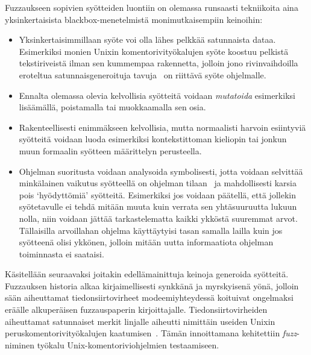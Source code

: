 Fuzzaukseen sopivien syötteiden luontiin on olemassa runsaasti tekniikoita
aina yksinkertaisista blackbox-menetelmistä monimutkaisempiin keinoihin:
\begin{itemize}
    \item Yksinkertaisimmillaan syöte voi olla lähes pelkkää satunnaista dataa.
          Esimerkiksi monien Unixin komentorivityökalujen syöte koostuu pelkistä tekstiriveistä
          ilman sen kummempaa rakennetta,
          jolloin jono rivinvaihdoilla eroteltua satunnaisgeneroituja
          tavuja~\cite{UnixReliability} on riittävä syöte ohjelmalle.
    \item Ennalta olemassa olevia kelvollisia syötteitä voidaan \emph{mutatoida} esimerkiksi
          lisäämällä, poistamalla tai muokkaamalla sen osia.
    \item Rakenteellisesti enimmäkseen kelvollisia, mutta normaalisti harvoin esiintyviä syötteitä voidaan
          luoda esimerkiksi kontekstittoman kieliopin tai jonkun muun formaalin syötteen määrittelyn perusteella.
    \item Ohjelman suoritusta voidaan analysoida symbolisesti, jotta voidaan
          selvittää minkälainen vaikutus syötteellä on ohjelman tilaan~\cite{SageArtikkeli}
          ja mahdollisesti karsia pois `hyödyttömiä' syötteitä.
          Esimerkiksi jos voidaan päätellä, että jollekin syötetavulle ei tehdä mitään muuta kuin
          verrata sen yhtäsuuruutta lukuun nolla,
          niin voidaan jättää tarkastelematta kaikki ykköstä suuremmat arvot.
          Tällaisilla arvoillahan ohjelma käyttäytyisi tasan samalla lailla
          kuin jos syötteenä olisi ykkönen,
          jolloin mitään uutta informaatiota ohjelman toiminnasta ei saataisi.

\end{itemize}

\fixme[wut?]
Kä\-si\-tel\-lään seuraavaksi joitakin e\-del\-lä\-mai\-nit\-tu\-ja keinoja generoida syötteitä.
%
%
Fuzzauksen historia alkaa kirjaimellisesti synkkänä ja myrskyisenä yönä,
jolloin sään aiheuttamat tiedonsiirtovirheet modeemiyhteydessä koituivat ongelmaksi
eräälle alkuperäisen fuzzauspaperin kirjoittajalle.
\fixme
Tiedonsiirtovirheiden aiheuttamat satunnaiset merkit linjalle aiheutti nimittäin
useiden Unixin peruskomentorivityökalujen kaatumisen~\cite{UnixReliability}.
Tämän innoittamana kehitettiin \emph{fuzz}-niminen työkalu Unix-komentoriviohjelmien testaamiseen.

